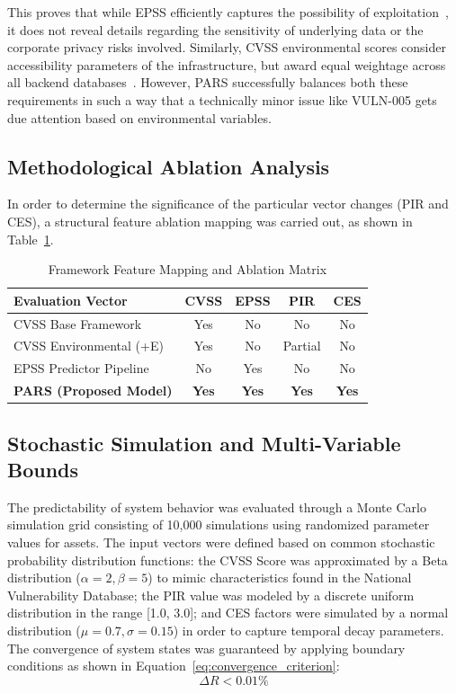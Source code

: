 \documentclass[conference,a4paper]{IEEEtran}
\begin{document}
This proves that while EPSS efficiently captures the possibility of exploitation~\cite{b16}, it does not reveal details regarding the sensitivity of underlying data or the corporate privacy risks involved. Similarly, CVSS environmental scores consider accessibility parameters of the infrastructure, but award equal weightage across all backend databases~\cite{b9}. However, PARS successfully balances both these requirements in such a way that a technically minor issue like VULN-005 gets due attention based on environmental variables.

\subsection{Methodological Ablation Analysis}
In order to determine the significance of the particular vector changes (PIR and CES), a structural feature ablation mapping was carried out, as shown in Table~\ref{tab:ablation_matrix}.

\begin{table}[htbp]
\caption{Framework Feature Mapping and Ablation Matrix}
\begin{center}
\begin{tabular}{lcccc}
\toprule
\textbf{Evaluation Vector} & \textbf{CVSS} & \textbf{EPSS} & \textbf{PIR} & \textbf{CES} \\
\midrule
CVSS Base Framework        & Yes & No  & No  & No   \\
CVSS Environmental (+E)    & Yes & No  & Partial & No   \\
EPSS Predictor Pipeline    & No  & Yes & No  & No   \\
\textbf{PARS (Proposed Model)} & \textbf{Yes} & \textbf{Yes} & \textbf{Yes} & \textbf{Yes} \\
\bottomrule
\end{tabular}
\label{tab:ablation_matrix}
\end{center}
\end{table}

\subsection{Stochastic Simulation and Multi-Variable Bounds}
The predictability of system behavior was evaluated through a Monte Carlo simulation grid consisting of 10,000 simulations using randomized parameter values for assets. The input vectors were defined based on common stochastic probability distribution functions: the CVSS Score was approximated by a Beta distribution ($\alpha = 2, \beta = 5$) to mimic characteristics found in the National Vulnerability Database; the PIR value was modeled by a discrete uniform distribution in the range [1.0, 3.0]; and CES factors were simulated by a normal distribution ($\mu = 0.7, \sigma = 0.15$) in order to capture temporal decay parameters. The convergence of system states was guaranteed by applying boundary conditions as shown in Equation~\eqref{eq:convergence_criterion}:
\begin{equation}
\Delta R < 0.01\%
\label{eq:convergence_criterion}
\end{equation}
\end{document}
